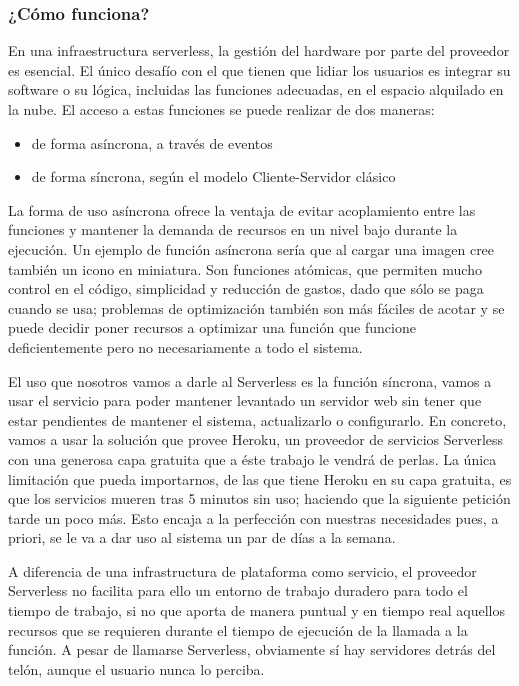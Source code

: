 \subsubsection{¿Cómo funciona?}
En una infraestructura serverless, la gestión del hardware por parte del proveedor es esencial. El único desafío con el que tienen que lidiar los usuarios es integrar su software o su lógica, incluidas las funciones adecuadas, en el espacio alquilado en la nube. El acceso a estas funciones se puede realizar de dos maneras:
\begin{itemize}
    \item de forma asíncrona, a través de eventos
    \item de forma síncrona, según el modelo Cliente-Servidor clásico
\end{itemize}
\vspace{1em}
\par La forma de uso asíncrona ofrece la ventaja de evitar acoplamiento entre las funciones y mantener la demanda de recursos en un nivel bajo durante la ejecución. Un ejemplo de función asíncrona sería que al cargar una imagen cree también un icono en miniatura. Son funciones atómicas, que permiten mucho control en el código, simplicidad y reducción de gastos, dado que sólo se paga cuando se usa; problemas de optimización también son más fáciles de acotar y se puede decidir poner recursos a optimizar una función que funcione deficientemente pero no necesariamente a todo el sistema.
\vspace{1em}
\par El uso que nosotros vamos a darle al Serverless es la función síncrona, vamos a usar el servicio para poder mantener levantado un servidor web sin tener que estar pendientes de mantener el sistema, actualizarlo o configurarlo. En concreto, vamos a usar la solución que provee Heroku, un proveedor de servicios Serverless con una generosa capa gratuita que a éste trabajo le vendrá de perlas. La única limitación que pueda importarnos, de las que tiene Heroku en su capa gratuita, es que los servicios mueren tras 5 minutos sin uso; haciendo que la siguiente petición tarde un poco más. Esto encaja a la perfección con nuestras necesidades pues, a priori, se le va a dar uso al sistema un par de días a la semana.
\vspace{1em}
\par A diferencia de una infrastructura de plataforma como servicio, el proveedor Serverless no facilita para ello un entorno de trabajo duradero para todo el tiempo de trabajo, si no que aporta de manera puntual y en tiempo real aquellos recursos que se requieren durante el tiempo de ejecución de la llamada a la función. A pesar de llamarse Serverless, obviamente sí hay servidores detrás del telón, aunque el usuario nunca lo perciba.
